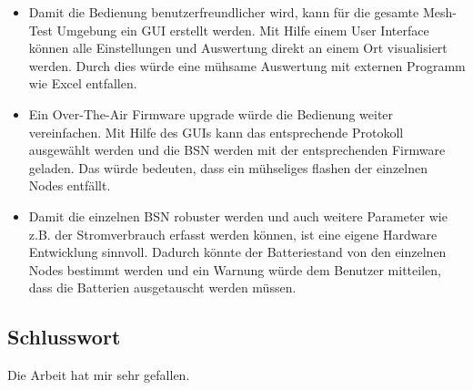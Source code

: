 \begin{itemize}
	\item Damit die Bedienung benutzerfreundlicher wird, kann für die gesamte Mesh-Test Umgebung ein GUI erstellt werden. Mit Hilfe einem User Interface können alle Einstellungen und Auswertung direkt an einem Ort visualisiert werden. Durch dies würde eine mühsame Auswertung mit externen Programm wie Excel entfallen.
	\item Ein Over-The-Air Firmware upgrade würde die Bedienung weiter vereinfachen. Mit Hilfe des GUIs kann das entsprechende Protokoll ausgewählt werden und die BSN werden mit der entsprechenden Firmware geladen. Das würde bedeuten, dass ein mühseliges flashen der einzelnen Nodes entfällt.
	\item Damit die einzelnen BSN robuster werden und auch weitere Parameter wie z.B. der Stromverbrauch erfasst werden können, ist eine eigene Hardware Entwicklung sinnvoll. Dadurch könnte der Batteriestand von den einzelnen Nodes bestimmt werden und ein Warnung würde dem Benutzer mitteilen, dass die Batterien ausgetauscht werden müssen.
\end{itemize}

\subsection{Schlusswort}\label{subsec:Schlusswort}
Die Arbeit hat mir sehr gefallen. 
